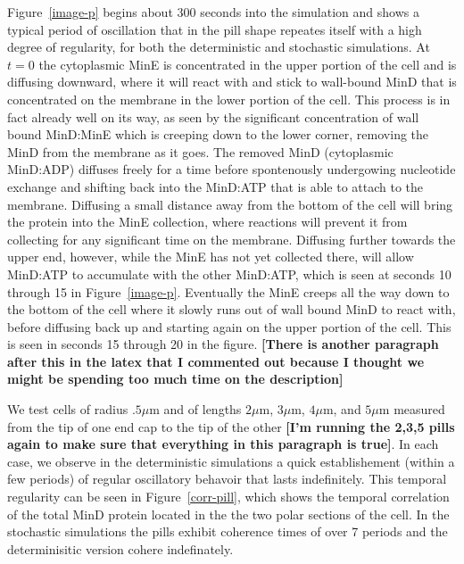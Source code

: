 \documentclass[letterpaper,twocolumn,amsmath,amssymb,pre]{revtex4-1}
\newcommand{\red}[1]{{\bf \color{red} #1}}
\newcommand{\fixme}[1]{\red{[#1]}}
\newcommand\micron{\ensuremath{\mu\text{m}}}
\begin{document}
Figure~\ref{image-p} begins about 300 seconds into the simulation and
shows a typical period of oscillation that in the pill shape repeates
itself with a high degree of regularity, for both the deterministic
and stochastic simulations.  At $t=0$ the cytoplasmic MinE is
concentrated in the upper portion of the cell and is diffusing
downward, where it will react with and stick to wall-bound MinD that
is concentrated on the membrane in the lower portion of the cell.
This process is in fact already well on its way, as seen by the
significant concentration of wall bound MinD:MinE which is creeping
down to the lower corner, removing the MinD from the membrane as it
goes.  The removed MinD (cytoplasmic MinD:ADP) diffuses freely for a
time before spontenously undergowing nucleotide exchange and shifting
back into the MinD:ATP that is able to attach to the membrane.
Diffusing a small distance away from the bottom of the cell will bring
the protein into the MinE collection, where reactions will prevent it
from collecting for any significant time on the membrane.  Diffusing
further towards the upper end, however, while the MinE has not yet
collected there, will allow MinD:ATP to accumulate with the other
MinD:ATP, which is seen at seconds 10 through 15 in
Figure~\ref{image-p}.  Eventually the MinE creeps all the way down to
the bottom of the cell where it slowly runs out of wall bound MinD to
react with, before diffusing back up and starting again on the upper
portion of the cell. This is seen in seconds 15 through 20 in the
figure.  \fixme{There is another paragraph after this in the latex
  that I commented out because I thought we might be spending too much
  time on the description}


We test cells of radius $.5\micron$ and of lengths $2\micron$,
$3\micron$, $4\micron$, and $5\micron$ measured from the tip of one
end cap to the tip of the other \fixme{I'm running the 2,3,5 pills
  again to make sure that everything in this paragraph is true}. In
each case, we observe in the deterministic simulations a quick
establishement (within a few periods) of regular oscillatory behavoir
that lasts indefinitely.  This temporal regularity can be seen in
Figure~\ref{corr-pill}, which shows the temporal correlation of the
total MinD protein located in the the two polar sections of the cell.
In the stochastic simulations the pills exhibit coherence times of
over 7 periods and the determinisitic version cohere indefinately.
\end{document}
